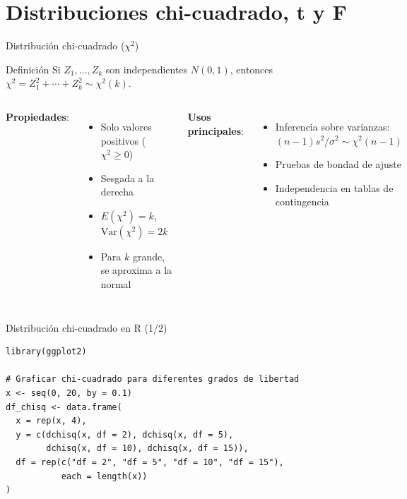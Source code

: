 \documentclass[aspectratio=169, 11pt]{beamer}
\begin{document}
\section{Distribuciones chi-cuadrado, t y F}

\begin{frame}{Distribución chi-cuadrado ($\chi^2$)}
\begin{block}{Definición}
Si $Z_1, \ldots, Z_k$ son independientes $N(0,1)$, entonces
$\chi^2 = Z_1^2 + \cdots + Z_k^2 \sim \chi^2(k)$.
\end{block}

\begin{columns}[T]
\textbf{Propiedades}:
\begin{itemize}
\item Solo valores positivos ($\chi^2 \geq 0$)
\item Sesgada a la derecha
\item $E(\chi^2) = k$, \ $\text{Var}(\chi^2) = 2k$
\item Para $k$ grande, se aproxima a la normal
\end{itemize}

\textbf{Usos principales}:
\begin{itemize}
\item Inferencia sobre varianzas: $(n-1)s^2/\sigma^2 \sim \chi^2(n-1)$
\item Pruebas de bondad de ajuste
\item Independencia en tablas de contingencia
\end{itemize}
\end{columns}
\end{frame}

\begin{frame}[fragile]{Distribución chi-cuadrado en R (1/2)}
\begin{lstlisting}
library(ggplot2)

# Graficar chi-cuadrado para diferentes grados de libertad
x <- seq(0, 20, by = 0.1)
df_chisq <- data.frame(
  x = rep(x, 4),
  y = c(dchisq(x, df = 2), dchisq(x, df = 5),
        dchisq(x, df = 10), dchisq(x, df = 15)),
  df = rep(c("df = 2", "df = 5", "df = 10", "df = 15"),
           each = length(x))
)
\end{lstlisting}
\end{frame}
\end{document}
